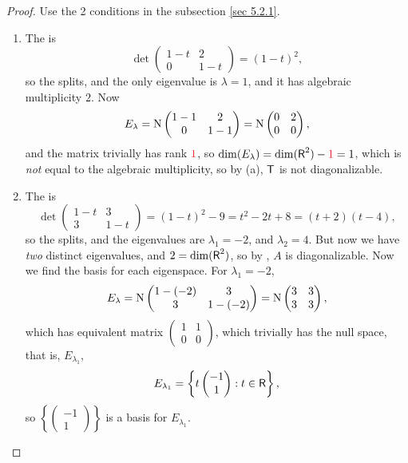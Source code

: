 \begin{proof}
Use the 2 conditions in the subsection \ref{sec 5.2.1}.
\begin{enumerate}
\item The \CPOLY{} is
\[
    \det \begin{pmatrix} 1 - t & 2 \\ 0 & 1 - t \end{pmatrix} = (1 - t)^2,
\]
so the \CPOLY{} splits, and the only eigenvalue is \(\lambda = 1\), and it has algebraic multiplicity \(2\).
Now
\[
    E_{\lambda} = \mathrm{N} \begin{pmatrix} 1 - 1 & 2 \\ 0 & 1 - 1 \end{pmatrix} = \mathrm{N} \begin{pmatrix} 0 & 2 \\ 0 & 0 \end{pmatrix},
\]
and the matrix trivially has rank \(\RED{1}\), so \(\dim(E_{\lambda}) = \dim(\SET{R}^2) - \RED{1} = 1\), which is \emph{not} equal to the algebraic multiplicity, so by (a), \(\textsf{T}\) is not diagonalizable.

\item The \CPOLY{} is
\[
    \det \begin{pmatrix} 1 - t & 3 \\ 3 & 1 - t \end{pmatrix} = (1 - t)^2 - 9 = t^2 - 2t + 8 = (t + 2)(t - 4),
\]
so the \CPOLY{} splits, and the eigenvalues are \(\lambda_1 = -2\), and \(\lambda_2 = 4\).
But now we have \emph{two} distinct eigenvalues, and \(2 = \dim(\textsf{R}^2)\), so by , \(A\) is diagonalizable.
Now we find the basis for each eigenspace.
For \(\lambda_1 = -2\),
\[
    E_{\lambda} = \mathrm{N} \begin{pmatrix} 1 - (-2) & 3 \\ 3 & 1 - (-2) \end{pmatrix} = \mathrm{N} \begin{pmatrix} 3 & 3 \\ 3 & 3 \end{pmatrix},
\]
which has equivalent matrix \(\begin{pmatrix} 1 & 1 \\ 0 & 0 \end{pmatrix}\), which trivially has the null space, that is, \(E_{\lambda_1}\),
\[
    E_{\lambda_1} = \left\{ t \begin{pmatrix} -1 \\ 1 \end{pmatrix} : t \in \textsf{R} \right\},
\]
so \(\left\{ \begin{pmatrix} -1 \\ 1 \end{pmatrix} \right\}\) is a basis for \(E_{\lambda_1}\).


\end{enumerate}
\end{proof}
